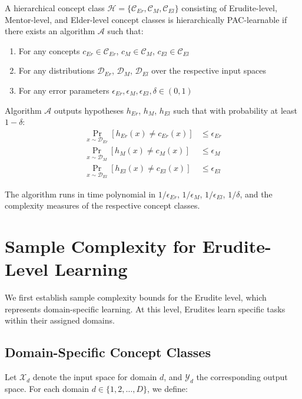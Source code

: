 \begin{definition}
A hierarchical concept class $\mathcal{H} = \{\mathcal{C}_{Er}, \mathcal{C}_{M}, \mathcal{C}_{El}\}$ consisting of Erudite-level, Mentor-level, and Elder-level concept classes is hierarchically PAC-learnable if there exists an algorithm $\mathcal{A}$ such that:
\begin{enumerate}
    \item For any concepts $c_{Er} \in \mathcal{C}_{Er}$, $c_{M} \in \mathcal{C}_{M}$, $c_{El} \in \mathcal{C}_{El}$
    \item For any distributions $\mathcal{D}_{Er}$, $\mathcal{D}_{M}$, $\mathcal{D}_{El}$ over the respective input spaces
    \item For any error parameters $\epsilon_{Er}, \epsilon_{M}, \epsilon_{El}, \delta \in (0, 1)$
\end{enumerate}

Algorithm $\mathcal{A}$ outputs hypotheses $h_{Er}$, $h_{M}$, $h_{El}$ such that with probability at least $1 - \delta$:
\begin{align}
\Pr_{x \sim \mathcal{D}_{Er}}[h_{Er}(x) \neq c_{Er}(x)] &\leq \epsilon_{Er} \\
\Pr_{x \sim \mathcal{D}_{M}}[h_{M}(x) \neq c_{M}(x)] &\leq \epsilon_{M} \\
\Pr_{x \sim \mathcal{D}_{El}}[h_{El}(x) \neq c_{El}(x)] &\leq \epsilon_{El}
\end{align}

The algorithm runs in time polynomial in $1/\epsilon_{Er}$, $1/\epsilon_{M}$, $1/\epsilon_{El}$, $1/\delta$, and the complexity measures of the respective concept classes.
\end{definition}

\section{Sample Complexity for Erudite-Level Learning}

We first establish sample complexity bounds for the Erudite level, which represents domain-specific learning. At this level, Erudites learn specific tasks within their assigned domains.

\subsection{Domain-Specific Concept Classes}

Let $\mathcal{X}_d$ denote the input space for domain $d$, and $\mathcal{Y}_d$ the corresponding output space. For each domain $d \in \{1, 2, \ldots, D\}$, we define:

